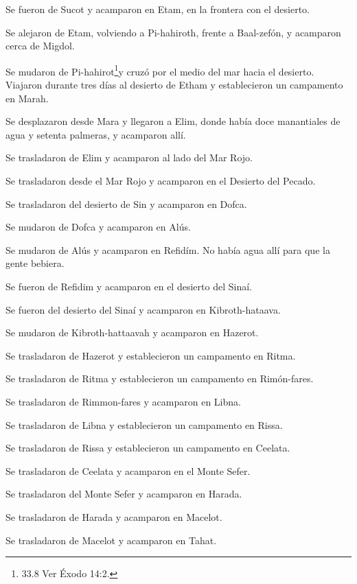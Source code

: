  Se fueron de Sucot y acamparon en Etam, en la frontera con
el desierto.

 Se alejaron de Etam, volviendo a Pi-hahiroth, frente a
Baal-zefón, y acamparon cerca de Migdol.

 Se mudaron de Pi-hahirot\footnote{33.8 Ver Éxodo 14:2.}y
cruzó por el medio del mar hacia el desierto. Viajaron durante tres días
al desierto de Etham y establecieron un campamento en Marah.

 Se desplazaron desde Mara y llegaron a Elim, donde había
doce manantiales de agua y setenta palmeras, y acamparon allí.

 Se trasladaron de Elim y acamparon al lado del Mar Rojo.

 Se trasladaron desde el Mar Rojo y acamparon en el
Desierto del Pecado.

 Se trasladaron del desierto de Sin y acamparon en Dofca.

 Se mudaron de Dofca y acamparon en Alús.

 Se mudaron de Alús y acamparon en Refidím. No había agua
allí para que la gente bebiera.

 Se fueron de Refidim y acamparon en el desierto del Sinaí.

 Se fueron del desierto del Sinaí y acamparon en
Kibroth-hataava.

 Se mudaron de Kibroth-hattaavah y acamparon en Hazerot.

 Se trasladaron de Hazerot y establecieron un campamento en
Ritma.

 Se trasladaron de Ritma y establecieron un campamento en
Rimón-fares.

 Se trasladaron de Rimmon-fares y acamparon en Libna.

 Se trasladaron de Libna y establecieron un campamento en
Rissa.

 Se trasladaron de Rissa y establecieron un campamento en
Ceelata.

 Se trasladaron de Ceelata y acamparon en el Monte Sefer.

 Se trasladaron del Monte Sefer y acamparon en Harada.

 Se trasladaron de Harada y acamparon en Macelot.

 Se trasladaron de Macelot y acamparon en Tahat.

